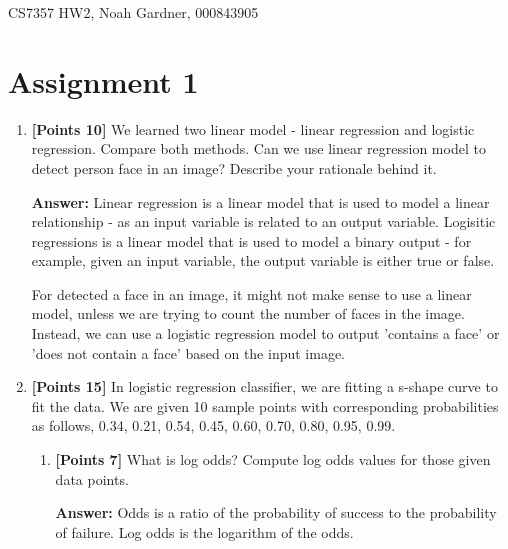 \documentclass[12pt]{article}
\begin{document}
CS7357 HW2, Noah Gardner, 000843905\newline

\section{Assignment 1}
\begin{enumerate}
    \item \textbf{[Points 10]} We learned two linear model - linear regression
          and logistic regression. Compare both methods. Can we use linear
          regression model to detect person face in an image? Describe your
          rationale behind it.

          \textbf{Answer:}
          Linear regression is a linear model that is used to model a linear
          relationship - as an input variable is related to an output variable.
          Logisitic regressions is a linear model that is used to model a binary
          output - for example, given an input variable, the output variable is
          either true or false.

          For detected a face in an image, it might not make sense to use a
          linear model, unless we are trying to count the number of faces in the
          image. Instead, we can use a logistic regression model to output
          'contains a face' or 'does not contain a face' based on the input
          image.

    \item \textbf{[Points 15]} In logistic regression classifier, we are fitting
          a s-shape curve to fit the data. We are given 10 sample points with
          corresponding probabilities as follows, 0.34, 0.21, 0.54, 0.45, 0.60,
          0.70, 0.80, 0.95, 0.99.

          \begin{enumerate}
              \item \textbf{[Points 7]} What is log odds? Compute log odds
                    values for those given data points.

                    \textbf{Answer:}
                    Odds is a ratio of the probability of success to the
                    probability of failure. Log odds is the logarithm of the
                    odds.


\end{enumerate}
\end{enumerate}
\end{document}
